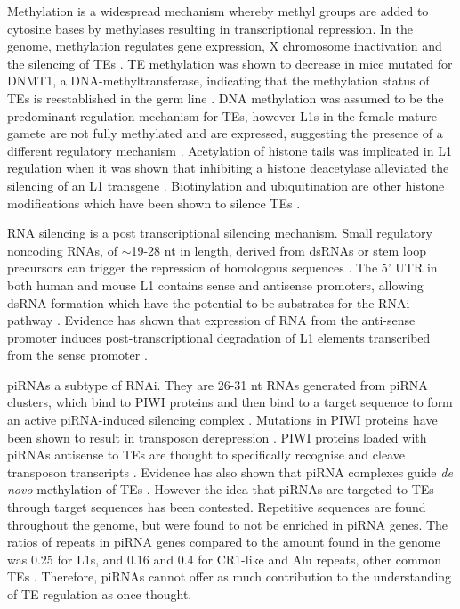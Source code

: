 \documentclass[12pt]{article}
\begin{document}
			Methylation is a widespread mechanism whereby methyl groups are added to cytosine bases by methylases resulting in transcriptional repression. In the genome, methylation regulates gene expression, X chromosome inactivation and the silencing of TEs \citep{EnLi14}. TE methylation was shown to decrease in mice mutated for DNMT1, a DNA-methyltransferase, indicating that the methylation status of TEs is reestablished in the germ line \citep{Okano99, Walsh98}. DNA methylation was assumed to be the predominant regulation mechanism for TEs, however L1s in the female mature gamete are not fully methylated and are expressed, suggesting the presence of a different regulatory mechanism \citep{Peaston04}.
			Acetylation of histone tails was implicated in L1 regulation when it was shown that inhibiting a histone deacetylase alleviated the silencing of an L1 transgene \citep{Garcia-Perez10}. Biotinylation and ubiquitination are other histone modifications which have been shown to silence TEs \citep{Chew08,Zempleni09, Sridhar07}. 

			RNA silencing is a post transcriptional silencing mechanism. Small regulatory noncoding RNAs, of $\sim$19-28 nt in length, derived from dsRNAs or stem loop precursors can trigger the repression of homologous sequences \citep{Obbard09}. The 5' UTR in both human and mouse L1 contains sense and antisense promoters, allowing dsRNA formation which have the potential to be substrates for the RNAi pathway \citep{JingfengLi14,Matlik06}. Evidence has shown that expression of RNA from the anti-sense promoter induces post-transcriptional degradation of L1 elements transcribed from the sense promoter \citep{Yang06}. 
			
			piRNAs a subtype of RNAi. They are 26-31 nt RNAs generated from piRNA clusters, which bind to PIWI proteins and then bind to a target sequence to form an active piRNA-induced silencing complex \citep{Bodak14,Castaneda11, Siomi11}.
			Mutations in PIWI proteins have been shown to result in transposon derepression \citep{Kalmykova05,Vagin04}. 
			PIWI proteins loaded with piRNAs antisense to TEs are thought to specifically recognise and cleave transposon transcripts \citep{Brennecke07,Gunawardane07}. Evidence has also shown that piRNA complexes guide \textit{de novo} methylation of TEs \citep{Aravin07,Kuramochi08}. However the idea that piRNAs are targeted to TEs through target sequences has been contested. Repetitive sequences are found throughout the genome, but were found to not be enriched in piRNA genes. The ratios of repeats in piRNA genes compared to the amount found in the genome was 0.25 for L1s, and 0.16 and 0.4 for CR1-like and Alu repeats, other common TEs \citep{Williams15}. Therefore, piRNAs cannot offer as much contribution to the understanding of TE regulation as once thought.
			
\end{document}
